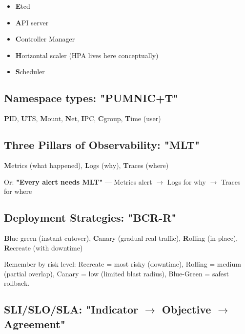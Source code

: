 \documentclass[11pt]{article}
\providecommand{\tightlist}{\setlength{\itemsep}{1pt}\setlength{\parskip}{0pt}}
\begin{document}
\begin{itemize}
\tightlist
\item
  \textbf{E}tcd
\item
  \textbf{A}PI server
\item
  \textbf{C}ontroller Manager
\item
  \textbf{H}orizontal scaler (HPA lives here conceptually)
\item
  \textbf{S}cheduler
\end{itemize}

\subsection{Namespace types: "PUMNIC+T"}\label{namespace-types-pumnict}

\textbf{P}ID, \textbf{U}TS, \textbf{M}ount, \textbf{N}et, \textbf{I}PC, \textbf{C}group, \textbf{T}ime (user)

\subsection{Three Pillars of Observability: "MLT"}\label{three-pillars-of-observability-mlt}

\textbf{M}etrics (what happened), \textbf{L}ogs (why), \textbf{T}races (where)

Or: \textbf{"Every alert needs MLT"} --- Metrics alert \(\rightarrow\) Logs for why \(\rightarrow\) Traces for where

\subsection{Deployment Strategies: "BCR-R"}\label{deployment-strategies-bcr-r}

\textbf{B}lue-green (instant cutover), \textbf{C}anary (gradual real traffic), \textbf{R}olling (in-place), \textbf{R}ecreate (with downtime)

Remember by risk level: Recreate = most risky (downtime), Rolling = medium (partial overlap), Canary = low (limited blast radius), Blue-Green = safest rollback.

\subsection{\texorpdfstring{SLI/SLO/SLA: "Indicator \(\rightarrow\) Objective \(\rightarrow\) Agreement"}{SLI/SLO/SLA: "Indicator \textbackslash rightarrow Objective \textbackslash rightarrow Agreement"}}\label{slislosla-indicator-rightarrow-objective-rightarrow-agreement}
\end{document}
